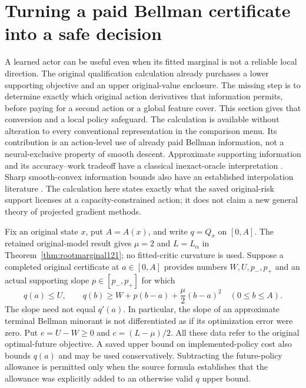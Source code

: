 \section{Turning a paid Bellman certificate into a safe decision}
\label{sec:supportaction122}

A learned actor can be useful even when its fitted marginal is not a reliable
local direction. The original qualification calculation already purchases a
lower supporting objective and an upper original-value enclosure. The missing
step is to determine exactly which original action derivatives that information
permits, before paying for a second action or a global feature cover. This
section gives that conversion and a local policy safeguard. The calculation
is available without alteration to every conventional representation in the
comparison menu. Its contribution is an action-level use of already paid
Bellman information, not a neural-exclusive property of smooth descent.
Approximate supporting information and its accuracy--work tradeoff have a
classical inexact-oracle interpretation \citep{DGN2014Inexact122}.
Sharp smooth-convex information bounds also have an established interpolation
literature \citep{THG2017Interpolation122}. The calculation here states exactly
what the saved original-risk support licenses at a capacity-constrained action;
it does not claim a new general theory of projected gradient methods.

Fix an original state $x$, put $A=A(x)$, and write $q=Q_x$ on $[0,A]$.
The retained original-model result gives $\mu=2$ and
$L=L_\alpha$ in Theorem~\ref{thm:rootmarginal121}; no fitted-critic
curvature is used. Suppose a completed original certificate at $a\in[0,A]$
provides numbers $W,U,p_-,p_+$ and an actual supporting slope
$p\in[p_-,p_+]$ for which
\begin{equation}\label{eq:paidinformation122}
 q(a)\le U,\qquad
 q(b)\ge W+p(b-a)+\frac\mu2(b-a)^2\quad(0\le b\le A).
\end{equation}
The slope need not equal $q'(a)$. In particular, the slope of an approximate
terminal Bellman minorant is not differentiated as if its optimization error
were zero. Put $e=U-W\ge0$ and $c=(L-\mu)/2$.
All these data refer to the original optimal-future objective. A saved upper
bound on implemented-policy cost also bounds $q(a)$ and may be used
conservatively. Subtracting the future-policy allowance is permitted only
when the source formula establishes that the allowance was explicitly
added to an otherwise valid $q$ upper bound.

